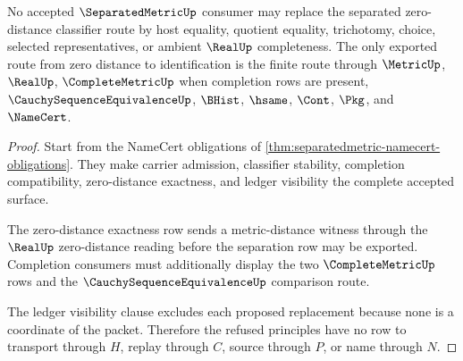 \begin{theorem}
\label{thm:separatedmetric-zero-distance-refusal}
No accepted $\SeparatedMetricUp$ consumer may replace the separated zero-distance classifier route by host equality, quotient equality, trichotomy, choice, selected representatives, or ambient $\RealUp$ completeness. The only exported route from zero distance to identification is the finite route through $\MetricUp$, $\RealUp$, $\CompleteMetricUp$ when completion rows are present, $\CauchySequenceEquivalenceUp$, $\BHist$, $\hsame$, $\Cont$, $\Pkg$, and $\NameCert$.
\end{theorem}
\begin{proof}
Start from the NameCert obligations of \autoref{thm:separatedmetric-namecert-obligations}. They make carrier admission, classifier stability, completion compatibility, zero-distance exactness, and ledger visibility the complete accepted surface.

The zero-distance exactness row sends a metric-distance witness through the $\RealUp$ zero-distance reading before the separation row may be exported. Completion consumers must additionally display the two $\CompleteMetricUp$ rows and the $\CauchySequenceEquivalenceUp$ comparison route.

The ledger visibility clause excludes each proposed replacement because none is a coordinate of the packet. Therefore the refused principles have no row to transport through $H$, replay through $C$, source through $P$, or name through $N$.
\end{proof}

